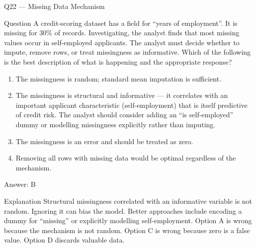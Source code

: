 \documentclass[aspectratio=169,8pt]{beamer}
\begin{document}
	\begin{frame}{Q22 --- Missing Data Mechanism}
		\begin{block}{Question}
			A credit-scoring dataset has a field for ``years of employment''. It is missing for 30\% of records. Investigating, the analyst finds that most missing values occur in self-employed applicants. The analyst must decide whether to impute, remove rows, or treat missingness as informative. Which of the following is the best description of what is happening and the appropriate response?
		\end{block}
		\begin{enumerate}
			\item The missingness is random; standard mean imputation is sufficient.
			\item The missingness is structural and informative --- it correlates with an important applicant characteristic (self-employment) that is itself predictive of credit risk. The analyst should consider adding an ``is self-employed'' dummy or modelling missingness explicitly rather than imputing.
			\item The missingness is an error and should be treated as zero.
			\item Removing all rows with missing data would be optimal regardless of the mechanism.
		\end{enumerate}
		\begin{exampleblock}{Answer: B}\end{exampleblock}
		\begin{block}{Explanation}
			Structural missingness correlated with an informative variable is not random. Ignoring it can bias the model. Better approaches include encoding a dummy for ``missing'' or explicitly modelling self-employment. Option A is wrong because the mechanism is not random. Option C is wrong because zero is a false value. Option D discards valuable data.
		\end{block}
	\end{frame}
	
\end{document}
